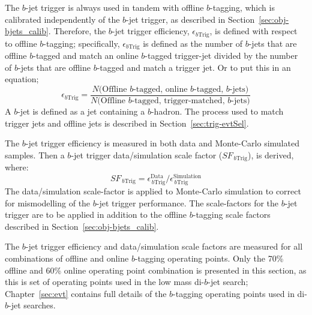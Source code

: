 The $b$-jet trigger is always used in tandem with offline $b$-tagging, which is calibrated independently of the $b$-jet trigger, as described in Section~\ref{sec:obj-bjets_calib}.
Therefore, the $b$-jet trigger efficiency, $\epsilon_{b\text{Trig}}$, is defined with respect to offline $b$-tagging;
specifically, $\epsilon_{b\text{Trig}}$ is defined as the number of $b$-jets that are offline $b$-tagged and match an online $b$-tagged trigger-jet
divided by the number of $b$-jets that are offline $b$-tagged and match a trigger jet.
Or to put this in an equation;
\begin{equation}
  \epsilon_{b\text{Trig}} = \frac{N(\text{Offline $b$-tagged, online $b$-tagged, $b$-jets)}}{N(\text{Offline $b$-tagged, trigger-matched, $b$-jets)}}
  \label{eq:trig-eff}
\end{equation}
A $b$-jet is defined as a jet containing a $b$-hadron.
The process used to match trigger jets and offline jets is described in Section~\ref{sec:trig-evtSel}.

The $b$-jet trigger efficiency is measured in both data and Monte-Carlo simulated samples.
Then a $b$-jet trigger data/simulation scale factor ($SF_{\,b\text{Trig}}$), is derived, where:
\begin{equation}
 SF_{\,b\text{Trig}} = \epsilon_{\,b\text{Trig}}^{\text{Data}}/\epsilon_{\,b\text{Trig}}^{\text{Simulation}}
\end{equation}
The data/simulation scale-factor is applied to Monte-Carlo simulation to correct for mismodelling of the $b$-jet trigger performance.
The scale-factors for the $b$-jet trigger are to be applied in addition to the offline $b$-tagging scale factors described in Section~\ref{sec:obj-bjets_calib}.

The $b$-jet trigger efficiency and data/simulation scale factors are measured for all combinations of offline and online $b$-tagging operating points.
Only the 70\% offline and 60\% online operating point combination is presented in this section,
as this is set of operating points used in the low mass di-$b$-jet search;
Chapter~\ref{sec:evt} contains full details of the $b$-tagging operating points used in di-$b$-jet searches.

